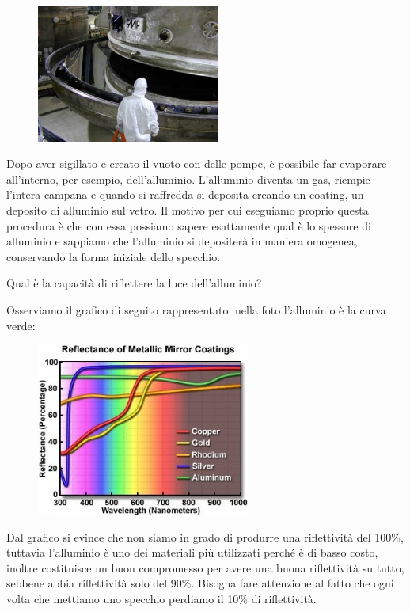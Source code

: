 \begin{minipage}{0.395\textwidth}
    \begin{figure}[H]
        \centering
        \includegraphics[width=6cm]{15.jpg}
    \end{figure}
\end{minipage}
\begin{minipage}{0.6\textwidth}
    \vspace{0.3cm}Dopo aver sigillato e creato il vuoto con delle pompe, è possibile far evaporare all'interno, per esempio, dell'alluminio. L'alluminio diventa un gas, riempie l'intera campana e quando si raffredda si deposita creando un coating, un deposito di alluminio sul vetro. Il motivo per cui eseguiamo proprio questa procedura è che con essa possiamo sapere esattamente qual è lo spessore di alluminio e sappiamo che l'alluminio si depositerà in maniera omogenea, conservando la forma iniziale dello specchio.
\end{minipage}

\vspace{0.2cm}Qual è la capacità di riflettere la luce dell'alluminio?

Osserviamo il grafico di seguito rappresentato: nella foto l'alluminio è la curva verde:

\begin{minipage}{0.495\textwidth}
    \begin{figure}[H]
        \centering
        \includegraphics[width=7cm]{16.jpg}
    \end{figure}
\end{minipage}
\begin{minipage}{0.5\textwidth}
    \vspace{0.5cm}Dal grafico si evince che non siamo in grado di produrre una riflettività del 100\%, tuttavia l'alluminio è uno dei materiali più utilizzati perché è di basso costo, inoltre costituisce un buon compromesso per avere una buona riflettività su tutto, sebbene abbia riflettività solo del 90\%. Bisogna fare attenzione al fatto che ogni volta che mettiamo uno specchio perdiamo il 10\% di riflettività.
\end{minipage}

